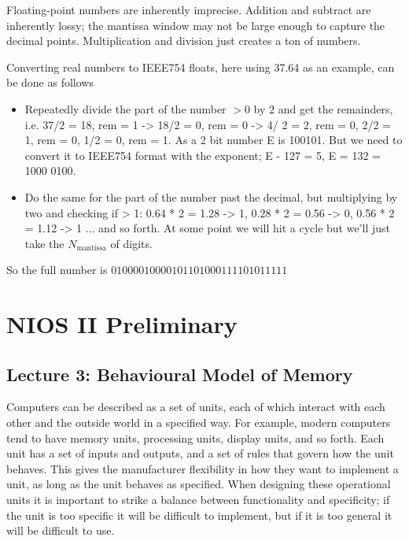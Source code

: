 \documentclass[../notes.tex]{subfiles}
\begin{document}
\begin{definition}
	Floating-point numbers are inherently imprecise. Addition and subtract are inherently lossy; the mantissa window may not be large enough to capture the decimal points. Multiplication and division just creates a ton of numbers.

	Converting real numbers to IEEE754 floats, here using 37.64 as an example, can be done as follows
	\begin{itemize}
		\item Repeatedly divide the part of the number $ >0 $ by $ 2 $ and get the remainders, i.e. 37/2 = 18, rem = 1 -> 18/2 = 0, rem = 0 -> 4/ 2 = 2, rem = 0, 2/2 = 1, rem = 0, 1/2 = 0, rem = 1. As a 2 bit number E is 100101. But we need to convert it to IEEE754 format with the exponent; E - 127 = 5, E = 132 = 1000 0100.
		\item Do the same for the part of the number past the decimal, but multiplying by two and checking if > 1: 0.64 * 2 = 1.28 -> 1, 0.28 * 2 = 0.56 -> 0, 0.56 * 2 = 1.12 -> 1 ... and so forth. At some point we will hit a cycle but we'll just take the $ N_{\text{mantissa}} $ of digits.
	\end{itemize}

	So the full number is $  0 1000 0100 0010 1101 0001 1110 1011 111 $
\end{definition}


\section{NIOS II Preliminary}


\subsection{Lecture 3: Behavioural Model of Memory}


Computers can be described as a set of units, each of which interact with each other and the outside world in a specified way.
For example, modern computers tend to have memory units, processing units, display units, and so forth.
Each unit has a set of inputs and outputs, and a set of rules that govern how the unit behaves.
This gives the manufacturer flexibility in how they want to implement a unit, as long as the unit behaves as specified.
When designing these operational units it is important to strike a balance between functionality and specificity; if the unit is too specific it will be difficult to implement, but if it is too general it will be difficult to use.
\end{document}
